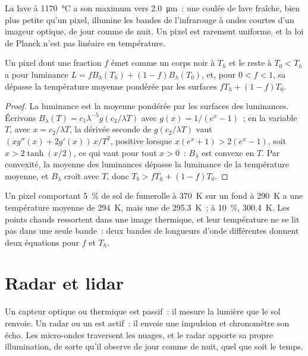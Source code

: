 La lave à \qty{1170}{\celsius} a son maximum vers \qty{2.0}{\micro\metre}~: une
coulée de lave fraîche, bien plus petite qu'un pixel, illumine les bandes de
l'infrarouge à ondes courtes d'un imageur optique, de jour comme de nuit. Un pixel
est rarement uniforme, et la loi de Planck n'est pas linéaire en température.

\begin{proposition}\label{prop:b3:remote-sensing-gis:mixed}
Un pixel dont une fraction $f$ émet comme un corps noir à $T_h$ et le reste
à $T_0 < T_h$ a pour luminance $L = fB_\lambda(T_h) + (1 - f)B_\lambda(T_0)$,
et, pour $0 < f < 1$, sa  dépasse la température
moyenne pondérée par les surfaces $fT_h + (1 - f)T_0$.
\end{proposition}

\begin{proof}
La luminance est la moyenne pondérée par les surfaces des luminances. Écrivons $B_\lambda(T)
= c_1\lambda^{-5}g(c_2/\lambda T)$ avec $g(x) = 1/(e^x - 1)$~; en la variable $T$,
avec $x = c_2/\lambda T$, la dérivée seconde de
$g(c_2/\lambda T)$ vaut $(x g''(x) + 2g'(x))\,x/T^2$, positive lorsque $x(e^x + 1)
> 2(e^x - 1)$, soit $x > 2\tanh(x/2)$, ce qui vaut pour tout $x > 0$~:
$B_\lambda$ est convexe en $T$. Par convexité,
la moyenne des luminances dépasse la luminance de la température moyenne, et
$B_\lambda$ croît avec $T$, donc $T_b > fT_h + (1 - f)T_0$.
\end{proof}

Un pixel comportant \qty{5}{\percent} de
sol de fumerolle à \qty{370}{K} sur un fond à \qty{290}{K} a une température
moyenne de \qty{294}{K}, mais une  de \qty{295.3}{K}~;
à \qty{10}{\percent}, \qty{300.4}{K}. Les points chauds ressortent dans une
image thermique, et leur température ne se lit pas dans une seule bande~: deux bandes
de longueurs d'onde différentes donnent deux équations pour $f$ et $T_h$.

\section{Radar et lidar}\label{sec:b3:remote-sensing-gis:radar}

Un capteur optique ou thermique est passif~: il mesure la lumière que le sol
renvoie. Un radar ou un  est actif~: il envoie une impulsion et chronomètre son écho.
Les micro-ondes traversent les nuages, et le radar apporte sa propre illumination,
de sorte qu'il observe de jour comme de nuit, quel que soit le temps.

